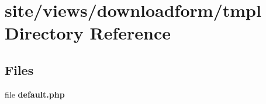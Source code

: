 \section{site/views/downloadform/tmpl Directory Reference}
\label{dir_2f7cabc28628f09cd3e0b937e93a0d46}
\subsection*{Files}
\begin{DoxyCompactItemize}
\item 
file \textbf{ default.\+php}
\end{DoxyCompactItemize}
